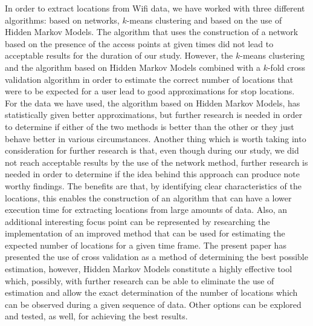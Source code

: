 In order to extract locations from Wifi data, we have worked with three
different algorithms: based on networks, $k$-means clustering and based on the
use of Hidden Markov Models. The algorithm that uses the construction of a
network based on the presence of the access points at given times did not lead
to acceptable results for the duration of our study. However, the $k$-means
clustering and the algorithm based on Hidden Markov Models combined with a
$k$-fold cross validation algorithm in order to estimate the correct number of
locations that were to be expected for a user lead to good approximations for
stop locations. For the data we have used, the algorithm based on Hidden Markov
Models, has statistically given better approximations, but further research is
needed in order to determine if either of the two methods is better than the
other or they just behave better in various circumstances. Another thing which
is worth taking into consideration for further research is that, even though
during our study, we did not reach acceptable results by the use of the network
method, further research is needed in order to determine if the idea behind this
approach can produce note worthy findings. The benefits are that, by identifying
clear characteristics of the locations, this enables the construction of an
algorithm that can have a lower execution time for extracting locations from
large amounts of data. Also, an additional interesting focus point can be
represented by researching the implementation of an improved method that can be
used for estimating the expected number of locations for a given time frame. The
present paper has presented the use of cross validation as a method of
determining the best possible estimation, however, Hidden Markov Models
constitute a highly effective tool which, possibly, with further research can
be able to eliminate the use of estimation and allow the exact determination of
the number of locations which can be observed during a given sequence of data.
Other options can be explored and tested, as well, for achieving the best
results.

